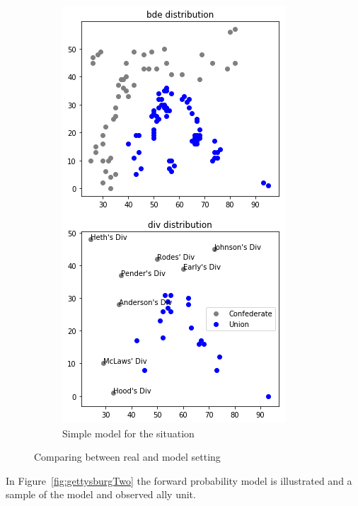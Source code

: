 \documentclass{article}
\begin{document}
\begin{figure}[h]
\begin{subfigure}[b]{0.49\linewidth}
    \includegraphics[width=\linewidth]{gettysburg-model.png}
    \caption{Simple model for the situation}
  \end{subfigure}
  \caption{Comparing between real and model setting}
  \label{fig:gettysburg}
\end{figure}

In Figure~\ref{fig:gettysburgTwo} the forward probability model is illustrated and a sample of the model and observed
ally unit.
\end{document}

